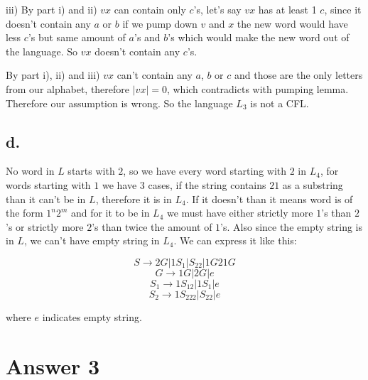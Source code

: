 \documentclass[12pt]{article}
\begin{document}
iii) By part i) and ii) $vx$ can contain only $c$'s, let's say $vx$ has at least 1 $c$, since
it doesn't contain any $a$ or $b$ if we pump down $v$ and $x$ the new word would have less $c$'s
but same amount of $a$'s and $b$'s which would make the new word out of the language. So $vx$
doesn't contain any $c$'s.

By part i), ii) and iii) $vx$ can't contain any $a$, $b$ or $c$ and those are the only letters
from our alphabet, therefore $|vx|=0$, which contradicts with pumping lemma. Therefore our
assumption is wrong. So the language $L_3$ is not a CFL.

\subsection*{d.}
No word in $L$ starts with $2$, so we have every word starting with $2$ in $L_4$, for words
starting with $1$ we have 3 cases, if the string contains $21$ as a substring than it can't be
in $L$, therefore it is in $L_4$. If it doesn't than it means word is of the form $1^n2^m$ and
for it to be in $L_4$ we must have either strictly more $1$'s than $2$'s or strictly more $2$'s
than twice the amount of $1$'s. Also since the empty string is in $L$, we can't have empty string
in $L_4$. We can express it like this:

$$S\rightarrow 2G | 1S_1 | S_22 | 1G21G$$
$$G\rightarrow 1G | 2G | e$$
$$S_1\rightarrow 1S_12 | 1S_1 | e$$
$$S_2\rightarrow 1S_222 | S_22 | e$$

where $e$ indicates empty string.


\section*{Answer 3}
\end{document}
